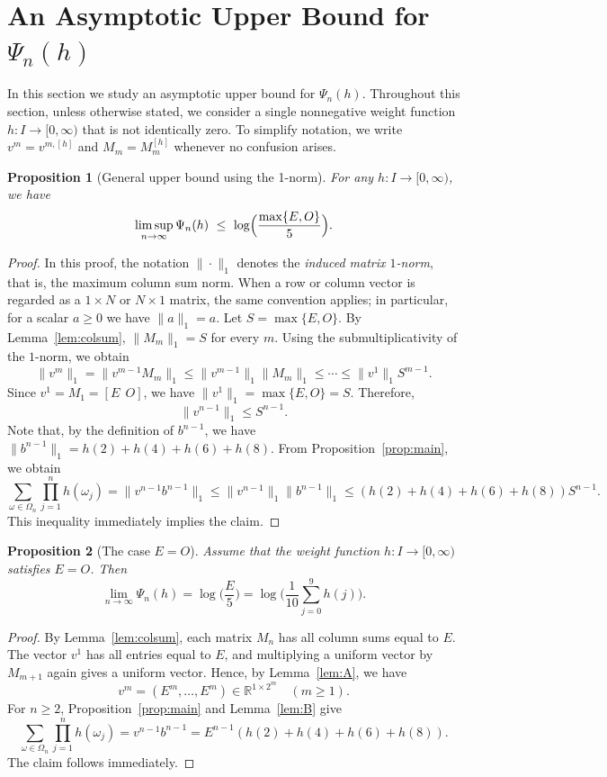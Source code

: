 \documentclass[11pt,a4paper]{article}
\newtheorem{proposition}{Proposition}
\theoremstyle{plain}
\begin{document}
\section{\texorpdfstring{An Asymptotic Upper Bound for $\Psi_n(h)$}{An Asymptotic Upper Bound for Psi\_n(h)}}\label{sec:ldp}
In this section we study an asymptotic upper bound for $\Psi_n(h)$.
Throughout this section, unless otherwise stated, we consider a single nonnegative weight function $h:I\to[0,\infty)$ that is not identically zero.  
To simplify notation, we write $v^m = v^{m,[h]}$ and $M_m = M_m^{[h]}$ whenever no confusion arises.


\begin{proposition}[General upper bound using the 1-norm]\label{prop:1norm}
For any $h:I\to[0,\infty)$, we have
\[
\limsup_{n\to\infty}\Psi_n(h)
\ \le\
\log \Bigl(\frac{\max\{E,O\}}{5}\Bigr).
\]
\end{proposition}

\begin{proof}
In this proof, the notation $\|\cdot\|_1$ denotes the \emph{induced matrix $1$-norm},
that is, the maximum column sum norm.
When a row or column vector is regarded as a $1\times N$ or $N\times1$ matrix,
the same convention applies; in particular, for a scalar $a\ge0$ we have $\|a\|_1 = a$.
Let $S = \max\{E,O\}$.  
By Lemma~\ref{lem:colsum}, $\|M_m\|_1 = S$ for every $m$.  
Using the submultiplicativity of the $1$-norm, we obtain
\[
\|v^m\|_1 = \|v^{m-1}M_m\|_1
 \le \|v^{m-1}\|_1 \|M_m\|_1
 \le \cdots \le \|v^1\|_1 S^{m-1}.
\]
Since $v^1 = M_1 = [E\ \ O]$, we have $\|v^1\|_1 = \max\{E,O\} = S$.  
Therefore,
\[
\|v^{n-1}\|_1 \le S^{n-1}.
\]
Note that, by the definition of $b^{n-1}$, we have $\|b^{n-1}\|_1 = h(2)+h(4)+h(6)+h(8)$.  
From Proposition~\ref{prop:main}, we obtain
\[
\sum_{\omega\in\Omega_n}\prod_{j=1}^n h(\omega_j)
=\| v^{n-1}b^{n-1} \|_1
\le 
\|v^{n-1}\|_1 \|b^{n-1}\|_1
 \le
(h(2)+h(4)+h(6)+h(8)) S^{n-1}.
\]
This inequality immediately implies the claim.
\end{proof}

\begin{proposition}[The case $E=O$]\label{prop:equalEO}
Assume that the weight function $h:I\to[0,\infty)$ satisfies $E=O$.  
Then
\[
\lim_{n\to\infty}\Psi_n(h)
=\log \Big( \frac{E}{5} \Big) = \log \Big(\frac{1}{10}\sum_{j=0}^{9}h(j)\Big).
\]
\end{proposition}

\begin{proof}
By Lemma~\ref{lem:colsum}, each matrix $M_n$ has all column sums equal to $E$.  
The vector $v^1$ has all entries equal to $E$, and multiplying a uniform vector by $M_{m+1}$ again gives a uniform vector.  
Hence, by Lemma~\ref{lem:A}, we have
\[
v^m = (E^m,\dots,E^m)\in\mathbb{R}^{1\times 2^m}\quad (m\ge1).
\]
For $n\ge2$, Proposition~\ref{prop:main} and Lemma~\ref{lem:B} give
\[
\sum_{\omega\in\Omega_n}\prod_{j=1}^n h(\omega_j)
= v^{n-1}b^{n-1}
= E^{n-1}(h(2)+h(4)+h(6)+h(8)).
\]
The claim follows immediately.
\end{proof}
\end{document}
